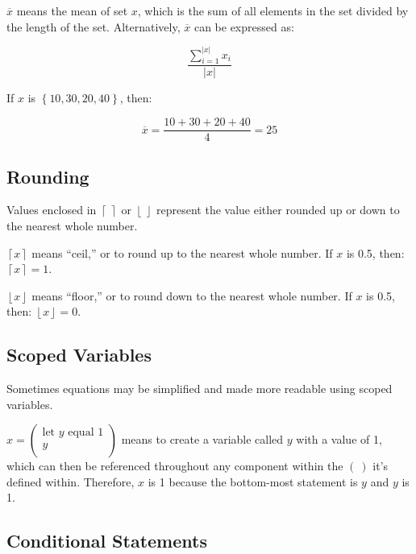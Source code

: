 \documentclass{article}
\begin{document}
\begin{sloppypar}
\(\overline{x}\) means the mean of set \(x\), which is the sum of all
elements in the set divided by the length of the set. Alternatively,
\(\overline{x}\) can be expressed as:

\[\frac{\sum_{i = 1}^{\left| x \right|}x_{i}}{\left| x \right|}\]

If \(x\) is \(\left\{ 10,30,20,40 \right\}\), then:

\[\overline{x} = \frac{10 + 30 + 20 + 40}{4} = 25\]

\hypertarget{rounding}{%
\subsection{Rounding}\label{rounding}}

Values enclosed in \(\left\lceil \  \right\rceil\) or
\(\left\lfloor \  \right\rfloor\) represent the value either rounded up
or down to the nearest whole number.

\(\left\lceil x \right\rceil\) means ``ceil,'' or to round up to the
nearest whole number. If \(x\) is 0.5, then:
\(\left\lceil x \right\rceil = 1\).

\(\left\lfloor x \right\rfloor\) means ``floor,'' or to round down to
the nearest whole number. If \(x\) is 0.5, then:
\(\left\lfloor x \right\rfloor = 0\).

\hypertarget{scoped-variables}{%
\subsection{Scoped Variables}\label{scoped-variables}}

Sometimes equations may be simplified and made more readable using
scoped variables.

\(x = \begin{pmatrix}
\text{let\ }y\text{\ equal\ }1 \\
y \\
\end{pmatrix}\) means to create a variable called \(y\) with a value of
1, which can then be referenced throughout any component within the
\(\left( \  \right)\) it's defined within. Therefore, \(x\) is 1 because
the bottom-most statement is \(y\) and \(y\) is 1.

\hypertarget{conditional-statements}{%
\subsection{Conditional Statements}\label{conditional-statements}}


\end{sloppypar}
\end{document}
